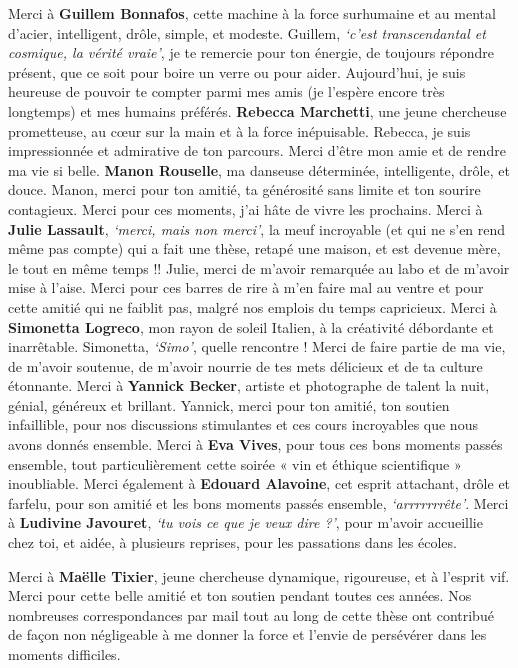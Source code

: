 \documentclass[
  a4paper,12pt,twoside,onecolumn,openright,final,oldfontcommands]{memoir}
\begin{document}
Merci à \textbf{Guillem Bonnafos}, cette machine à la force surhumaine et au mental d'acier, intelligent, drôle, simple, et modeste. Guillem, \emph{`c'est transcendantal et cosmique, la vérité vraie'}, je te remercie pour ton énergie, de toujours répondre présent, que ce soit pour boire un verre ou pour aider. Aujourd'hui, je suis heureuse de pouvoir te compter parmi mes amis (je l'espère encore très longtemps) et mes humains préférés. \textbf{Rebecca Marchetti}, une jeune chercheuse prometteuse, au cœur sur la main et à la force inépuisable. Rebecca, je suis impressionnée et admirative de ton parcours. Merci d'être mon amie et de rendre ma vie si belle. \textbf{Manon Rouselle}, ma danseuse déterminée, intelligente, drôle, et douce. Manon, merci pour ton amitié, ta générosité sans limite et ton sourire contagieux. Merci pour ces moments, j'ai hâte de vivre les prochains. Merci à \textbf{Julie Lassault}, \emph{`merci, mais non merci'}, la meuf incroyable (et qui ne s'en rend même pas compte) qui a fait une thèse, retapé une maison, et est devenue mère, le tout en même temps !! Julie, merci de m'avoir remarquée au labo et de m'avoir mise à l'aise. Merci pour ces barres de rire à m'en faire mal au ventre et pour cette amitié qui ne faiblit pas, malgré nos emplois du temps capricieux. Merci à \textbf{Simonetta Logreco}, mon rayon de soleil Italien, à la créativité débordante et inarrêtable. Simonetta, \emph{`Simo'}, quelle rencontre ! Merci de faire partie de ma vie, de m'avoir soutenue, de m'avoir nourrie de tes mets délicieux et de ta culture étonnante. Merci à \textbf{Yannick Becker}, artiste et photographe de talent la nuit, génial, généreux et brillant. Yannick, merci pour ton amitié, ton soutien infaillible, pour nos discussions stimulantes et ces cours incroyables que nous avons donnés ensemble. Merci à \textbf{Eva Vives}, pour tous ces bons moments passés ensemble, tout particulièrement cette soirée « vin et éthique scientifique » inoubliable. Merci également à \textbf{Edouard Alavoine}, cet esprit attachant, drôle et farfelu, pour son amitié et les bons moments passés ensemble, \emph{`arrrrrrrête'}. Merci à \textbf{Ludivine Javouret}, \emph{`tu vois ce que je veux dire ?'}, pour m'avoir accueillie chez toi, et aidée, à plusieurs reprises, pour les passations dans les écoles.

Merci à \textbf{Maëlle Tixier}, jeune chercheuse dynamique, rigoureuse, et à l'esprit vif. Merci pour cette belle amitié et ton soutien pendant toutes ces années. Nos nombreuses correspondances par mail tout au long de cette thèse ont contribué de façon non négligeable à me donner la force et l'envie de persévérer dans les moments difficiles.
\end{document}
